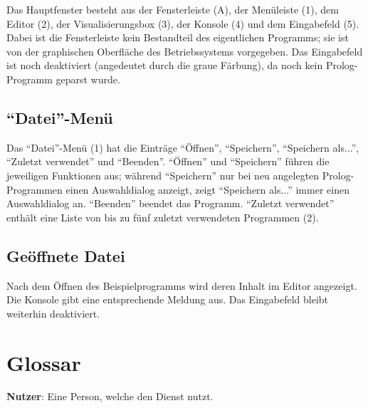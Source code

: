 \documentclass[parskip=full,11pt,twoside]{scrartcl}
\begin{document}
Das Hauptfenster besteht aus der Fensterleiste (A), der Menüleiste (1), dem Editor (2), der Visualisierungsbox (3), der Konsole (4) und dem Eingabefeld (5).
Dabei ist die Fensterleiste kein Bestandteil des eigentlichen Programms; sie ist von der graphischen Oberfläche des Betriebssystems vorgegeben.
Das Eingabefeld ist noch deaktiviert (angedeutet durch die graue Färbung), da noch kein Prolog-Programm geparst wurde.

\subsection{\enquote{Datei}-Menü}

\begin{minipage}{\linewidth}
\end{minipage}

Das \enquote{Datei}-Menü (1) hat die Einträge \enquote{Öffnen}, \enquote{Speichern}, \enquote{Speichern als...}, \enquote{Zuletzt verwendet} und \enquote{Beenden}.
\enquote{Öffnen} und \enquote{Speichern} führen die jeweiligen Funktionen aus; während \enquote{Speichern} nur bei neu angelegten Prolog-Programmen einen Auswahldialog anzeigt, zeigt \enquote{Speichern als...} immer einen Auswahldialog an.
\enquote{Beenden} beendet das Programm.
\enquote{Zuletzt verwendet} enthält eine Liste von bis zu fünf zuletzt verwendeten Programmen (2).

\subsection{Geöffnete Datei}

\begin{minipage}{\linewidth}
\end{minipage}

Nach dem Öffnen des Beispielprogramms wird deren Inhalt im Editor angezeigt.
Die Konsole gibt eine entsprechende Meldung aus.
Das Eingabefeld bleibt weiterhin deaktiviert.

\section{Glossar}

\textbf{Nutzer}:
Eine Person, welche den Dienst nutzt.
\end{document}
